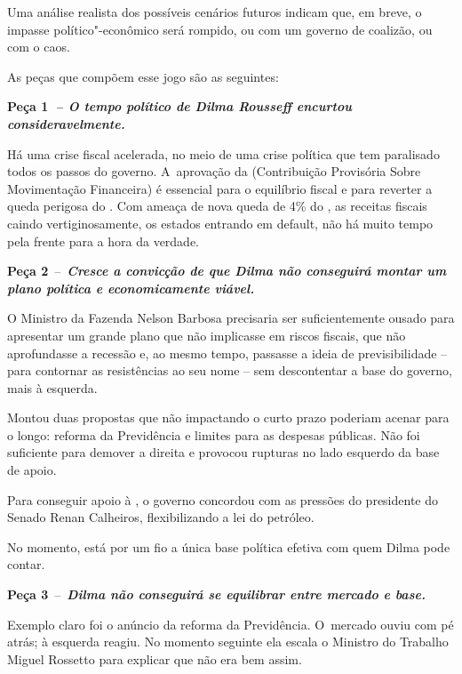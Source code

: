  

Uma análise realista dos possíveis cenários futuros indicam que, em
breve, o impasse político"-econômico será rompido, ou com um governo de
coalizão, ou com o caos.

As peças que compõem esse jogo são as seguintes:

\textbf{Peça 1\emph{~-- O tempo político de Dilma Rousseff encurtou
consideravelmente.}}

Há uma crise fiscal acelerada, no meio de uma crise política que tem
paralisado todos os passos do governo. A~aprovação da  (Contribuição
Provisória Sobre Movimentação Financeira) é essencial para o equilíbrio
fiscal e para reverter a queda perigosa do . Com ameaça de nova queda
de 4\% do , as receitas fiscais caindo vertiginosamente, os estados
entrando em default, não há muito tempo pela frente para a hora da
verdade.

\textbf{Peça 2}~--~\textbf{\emph{Cresce a convicção de que Dilma não
conseguirá montar um plano política e economicamente viável.}}

O Ministro da Fazenda Nelson Barbosa precisaria ser suficientemente
ousado para apresentar um grande plano que não implicasse em riscos
fiscais, que não aprofundasse a recessão e, ao mesmo tempo, passasse a
ideia de previsibilidade -- para contornar as resistências ao seu nome
-- sem descontentar a base do governo, mais à esquerda.

Montou duas propostas que não impactando o curto prazo poderiam acenar
para o longo: reforma da Previdência e limites para as despesas
públicas. Não foi suficiente para demover a direita e provocou rupturas
no lado esquerdo da base de apoio.

Para conseguir apoio à , o governo concordou com as pressões do
presidente do Senado Renan Calheiros, flexibilizando a lei do petróleo.

No momento, está por um fio a única base política efetiva com quem Dilma
pode contar.

\textbf{Peça 3}~--~\textbf{\emph{Dilma não conseguirá se equilibrar
entre mercado e base.}}

Exemplo claro foi o anúncio da reforma da Previdência. O~mercado ouviu
com pé atrás; à esquerda reagiu. No momento seguinte ela escala o
Ministro do Trabalho Miguel Rossetto para explicar que não era bem
assim.

